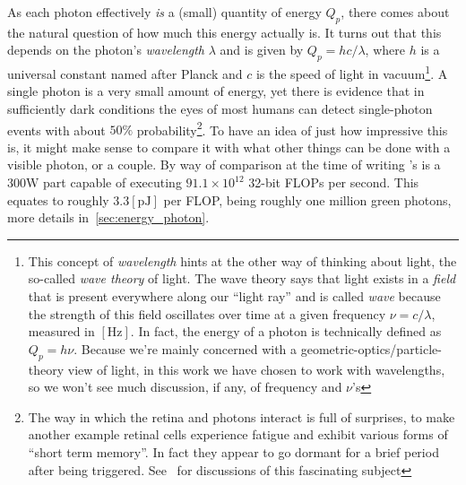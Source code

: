 As each photon effectively \emph{is} a (small) quantity of energy $Q_p$, there comes about 
the natural question of how much this energy actually is. 
It turns out that this depends on the photon's \textsl{\gls{wavelength}} $\lambda$ and is given by
$Q_p = hc/\lambda$, where $h$ is a universal constant named after Planck 
and $c$ is the speed of light in vacuum\footnote{This concept of \textsl{wavelength} hints 
	at the other way of thinking about light, the so-called \textsl{wave theory} of light. 
	The wave theory says that light exists in a \textsl{field} that is 
	present everywhere along our ``light ray'' and is called \textsl{wave} because the strength 
	of this field oscillates over time at a given frequency $\nu = c/\lambda$, 
	measured in $[\unit\hertz]$. 
	In fact, the energy of a photon is technically defined as $Q_p = h\nu$. 
	Because we're mainly concerned with a geometric-optics/particle-theory view of light, 
	in this work we have chosen to work with wavelengths, so we won't
	see much discussion, if any, of frequency and $\nu$'s}. 
A single photon is a very small amount of energy, yet there is evidence that in sufficiently 
dark conditions the eyes of most humans can detect single-photon events with about $50\%$ 
probability\footnote{
	The way in which the retina and photons interact is full of surprises, to make another
	example retinal cells experience fatigue and exhibit various forms of ``short term memory''.
	In fact they appear to go dormant for a brief period after being triggered.
	See~\cite{fairchild2013,wyszecki82} for discussions of this fascinating subject
}. 
To have an idea of just how impressive this is, it might make sense to compare it
with what other things can be done with a visible photon, or a couple. 
By way of comparison at the time of writing 's  
 is a $300 \unit{\watt}$ part capable of executing $91.1 \times 10^{12}$ 32-bit \glspl{FLOP} 
per second.
This equates to roughly $3.3 [\unit{\pico\joule}]$ per \gls{FLOP}, being roughly one million green
photons, more details in~\cref{sec:energy_photon}.

